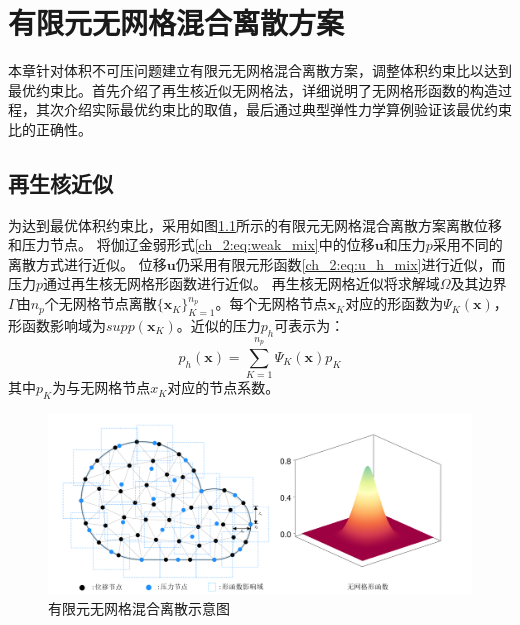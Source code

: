 \chapter{有限元无网格混合离散方案}

本章针对体积不可压问题建立有限元无网格混合离散方案，调整体积约束比以达到最优约束比。首先介绍了再生核近似无网格法，详细说明了无网格形函数的构造过程，其次介绍实际最优约束比的取值，最后通过典型弹性力学算例验证该最优约束比的正确性。
\section{再生核近似}
为达到最优体积约束比，采用如图\ref{ch_4:fig:meshfree}所示的有限元无网格混合离散方案离散位移和压力节点。
将伽辽金弱形式\eqref{ch_2:eq:weak_mix}中的位移$\boldsymbol{u}$和压力$p$采用不同的离散方式进行近似。
位移$\boldsymbol{u}$仍采用有限元形函数\eqref{ch_2:eq:u_h_mix}进行近似，而压力$p$通过再生核无网格形函数进行近似。
再生核无网格近似将求解域$\Omega$及其边界$\Gamma$由$n_p$个无网格节点离散$\{\boldsymbol x_K\}_{K=1}^{n_p}$。每个无网格节点$\boldsymbol x_K$对应的形函数为$\Psi_K(\boldsymbol{x})$，形函数影响域为$supp(\boldsymbol{x}_K)$。近似的压力$p_h$可表示为：
\begin{equation}
    p_h(\boldsymbol x) = \sum_{K=1}^{n_p} \Psi_K(\boldsymbol x) p_K
\end{equation}
其中$p_K$为与无网格节点$x_K$对应的节点系数。
\begin{figure}[H]
    \centering 
        \includegraphics[scale=0.6]{figures/meshfree.png}
        \caption{有限元无网格混合离散示意图}\label{ch_4:fig:meshfree}
\end{figure}

